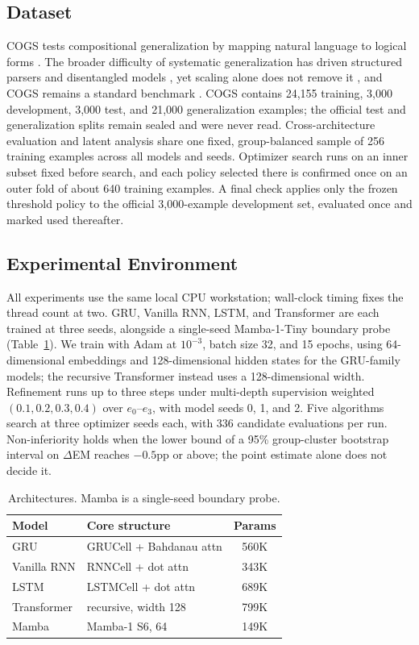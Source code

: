\documentclass[11pt]{article}
\begin{document}
\subsection{Dataset}
COGS tests compositional generalization by mapping natural language to logical forms \citep{kim2020cogs}. The broader difficulty of systematic generalization \citep{keysers2020measuring,furrer2020compositional} has driven structured parsers \citep{herzig2021span,shaw2021compositional} and disentangled models \citep{zheng2022disentangled}, yet scaling alone does not remove it \citep{qiu2022evaluating,li2023slog}, and COGS remains a standard benchmark \citep{weissenhorn2022compositional}. COGS contains 24{,}155 training, 3{,}000 development, 3{,}000 test, and 21{,}000 generalization examples; the official test and generalization splits remain sealed and were never read. Cross-architecture evaluation and latent analysis share one fixed, group-balanced sample of 256 training examples across all models and seeds. Optimizer search runs on an inner subset fixed before search, and each policy selected there is confirmed once on an outer fold of about 640 training examples. A final check applies only the frozen threshold policy to the official 3{,}000-example development set, evaluated once and marked used thereafter.

\subsection{Experimental Environment}
All experiments use the same local CPU workstation; wall-clock timing fixes the thread count at two. GRU, Vanilla RNN, LSTM, and Transformer are each trained at three seeds, alongside a single-seed Mamba-1-Tiny boundary probe (Table~\ref{tab:models}). We train with Adam at $10^{-3}$, batch size 32, and 15 epochs, using 64-dimensional embeddings and 128-dimensional hidden states for the GRU-family models; the recursive Transformer instead uses a 128-dimensional width. Refinement runs up to three steps under multi-depth supervision weighted $(0.1,0.2,0.3,0.4)$ over $e_0$--$e_3$, with model seeds 0, 1, and 2. Five algorithms search at three optimizer seeds each, with 336 candidate evaluations per run. Non-inferiority holds when the lower bound of a 95\% group-cluster bootstrap interval on $\Delta$EM reaches $-0.5$pp or above; the point estimate alone does not decide it.

\begin{table}[t]
\centering
\footnotesize
\begin{tabular}{@{}llc@{}}
\toprule
Model & Core structure & Params \\
\midrule
GRU & GRUCell + Bahdanau attn & 560K \\
Vanilla RNN & RNNCell + dot attn & 343K \\
LSTM & LSTMCell + dot attn & 689K \\
Transformer & recursive, width 128 & 799K \\
Mamba & Mamba-1 S6, 64 & 149K \\
\bottomrule
\end{tabular}
\caption{Architectures. Mamba is a single-seed boundary probe.}
\label{tab:models}
\end{table}
\end{document}
